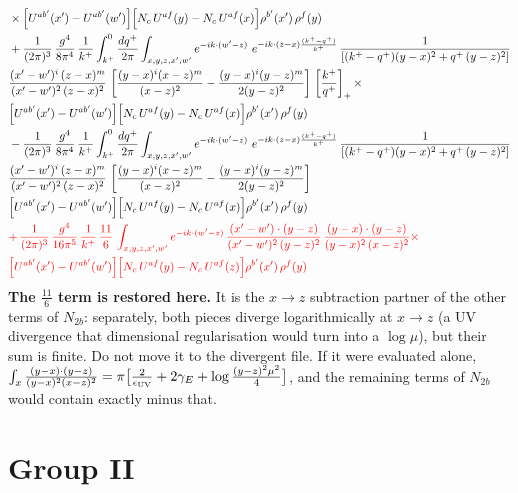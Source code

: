 \documentclass[9pt]{article}
\numberwithin{equation}{section}
\begin{document}
\begin{align}
&\times\Big[U^{ab'}(x')-U^{ab'}(w')\Big]\Big[N_{c}\,U^{af}(y)-N_{c}\,U^{af}(x)\Big]\rho^{b'}(x')\,\rho^{f}(y)\notag \\ & + \frac{1}{(2\pi)^{3}}\,\frac{g^{4}}{8\pi^{4}}\,\frac{1}{k^{+}}\int_{k^{+}}^{0}\frac{dq^{+}}{2\pi}\int_{x,y,z,x',w'}e^{-ik\cdot(w'-z)}\ e^{-ik\cdot(z-x)\frac{(k^{+}-q^{+})}{k^{+}}}\,\frac{1}{\left[(k^{+}-q^{+})(y-x)^{2}+q^{+}\,(y-z)^{2}\right]}\notag \\ & \frac{(x'-w')^{i}\,(z-x)^{m}}{(x'-w')^{2}\,(z-x)^{2}}\,\left[\frac{(y-x)^{i}(x-z)^{m}}{(x-z)^{2}}-\frac{(y-x)^{i}(y-z)^{m}}{2(y-z)^{2}}\right]\,\left[\frac{k^{+}}{q^{+}}\right]_{+}\times\notag \\ & \Big[U^{ab'}(x')-U^{ab'}(w')\Big]\Big[N_{c}\,U^{af}(y)-N_{c}\,U^{af}(x)\Big]\rho^{b'}(x')\,\rho^{f}(y)\notag \\ & - \frac{1}{(2\pi)^{3}}\,\frac{g^{4}}{8\pi^{4}}\,\frac{1}{k^{+}}\int_{k^{+}}^{0}\frac{dq^{+}}{2\pi}\int_{x,y,z,x',w'}e^{-ik\cdot(w'-z)}\ e^{-ik\cdot(z-x)\frac{(k^{+}-q^{+})}{k^{+}}}\,\frac{1}{\left[(k^{+}-q^{+})(y-x)^{2}+q^{+}\,(y-z)^{2}\right]}\notag \\ & \frac{(x'-w')^{i}\,(z-x)^{m}}{(x'-w')^{2}\,(z-x)^{2}}\,\left[\frac{(y-x)^{i}(x-z)^{m}}{(x-z)^{2}}-\frac{(y-x)^{i}(y-z)^{m}}{2(y-z)^{2}}\right]\notag \\ & \Big[U^{ab'}(x')-U^{ab'}(w')\Big]\Big[N_{c}\,U^{af}(y)-N_{c}\,U^{af}(x)\Big]\rho^{b'}(x')\,\rho^{f}(y)\notag \\ & {\color{red}+\, \frac{1}{(2\pi)^{3}}\,\frac{g^{4}}{16\pi^{5}}\,\frac{1}{k^{+}}\,\frac{11}{6}\,\int_{x,y,z,x',w'}e^{-ik\cdot(w'-z)}\, \frac{(x'-w')\cdot(y-z)}{(x'-w')^{2}\,(y-z)^{2}}\,\frac{(y-x)\cdot(y-z)}{(y-x)^{2}\,(x-z)^{2}}\times}\notag \\ & {\color{red}\Big[U^{ab'}(x')-U^{ab'}(w')\Big]\Big[N_{c}\,U^{af}(y)-N_{c}\,U^{af}(z)\Big]\rho^{b'}(x')\,\rho^{f}(y)}
\end{align}
{\color{red}\textbf{The $\frac{11}{6}$ term is restored here.} It is the $x\to z$ subtraction partner of the other terms of $N_{2b}$: separately, both pieces diverge logarithmically at $x\to z$ (a UV divergence that dimensional regularisation would turn into a $\log\mu$), but their sum is finite. Do not move it to the divergent file. If it were evaluated alone, $\int_{x}\frac{(y-x)\cdot(y-z)}{(y-x)^{2}(x-z)^{2}}=\pi\big[\frac{2}{\epsilon_{\rm UV}}+2\gamma_{E}+\log\frac{(y-z)^{2}\mu^{2}}{4}\big]$, and the remaining terms of $N_{2b}$ would contain exactly minus that.}
\section{Group II}
\end{document}
